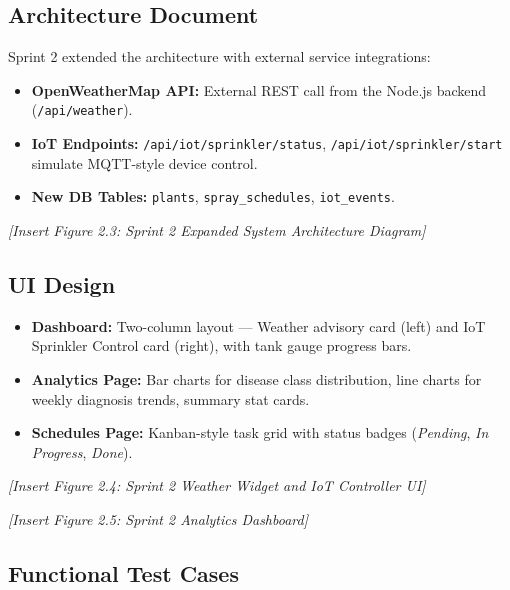 \documentclass[12pt,a4paper]{report}
\begin{document}
\subsection{Architecture Document}

Sprint 2 extended the architecture with external service integrations:

\begin{itemize}
  \item \textbf{OpenWeatherMap API:} External REST call from the Node.js backend (\texttt{/api/weather}).
  \item \textbf{IoT Endpoints:} \texttt{/api/iot/sprinkler/status}, \texttt{/api/iot/sprinkler/start} simulate MQTT-style device control.
  \item \textbf{New DB Tables:} \texttt{plants}, \texttt{spray\_schedules}, \texttt{iot\_events}.
\end{itemize}

\textit{[Insert Figure 2.3: Sprint 2 Expanded System Architecture Diagram]}

\subsection{UI Design}

\begin{itemize}
  \item \textbf{Dashboard:} Two-column layout — Weather advisory card (left) and IoT Sprinkler Control card (right), with tank gauge progress bars.
  \item \textbf{Analytics Page:} Bar charts for disease class distribution, line charts for weekly diagnosis trends, summary stat cards.
  \item \textbf{Schedules Page:} Kanban-style task grid with status badges (\textit{Pending}, \textit{In Progress}, \textit{Done}).
\end{itemize}

\textit{[Insert Figure 2.4: Sprint 2 Weather Widget and IoT Controller UI]}

\textit{[Insert Figure 2.5: Sprint 2 Analytics Dashboard]}

\subsection{Functional Test Cases}
\end{document}
